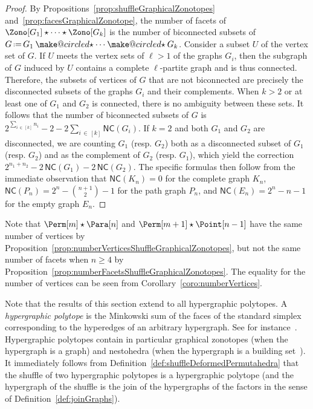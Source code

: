 \documentclass[AHL,Unicode,longabstracts,published]{cedram}
\makeatletter
\newcommand{\eqdef}{\mbox{\,\raisebox{0.2ex}{\scriptsize\ensuremath{\mathrm:}}\ensuremath{=}\,}}
\newcommand{\ostar}{\mathbin{\mathpalette\make@circled\star}}
\newcommand{\make@circled}[2]{%
  \ooalign{$\m@th#1\smallbigcirc{#1}$\cr\hidewidth$\m@th#1#2$\hidewidth\cr}%
}
\newcommand{\smallbigcirc}[1]{%
  \vcenter{\hbox{\scalebox{0.77778}{$\m@th#1\bigcirc$}}}%
}
\newcommand{\joinGraph}{\ostar} %
\newcommand{\shuffleDP}{\star} %
\newcommand{\nc}[1]{\mathsf{NC}(#1)}
\makeatother
\begin{document}
\begin{proof}
By Propositions~\ref{prop:shuffleGraphicalZonotopes} and~\ref{prop:facesGraphicalZonotope}, the number of facets of $\Zono[G_1] \shuffleDP \cdots \shuffleDP\linebreak \Zono[G_k]$ is the number of biconnected subsets of $G \eqdef G_1 \joinGraph \cdots \joinGraph G_k$. Consider a subset $U$ of the vertex set of $G$. If $U$ meets the vertex sets of $\ell > 1$ of the graphs $G_i$, then the subgraph of $G$ induced by $U$ contains a complete $\ell$-partite graph and is thus connected. Therefore, the subsets of vertices of $G$ that are not biconnected are precisely the disconnected subsets of the graphs $G_i$ and their complements. When $k > 2$ or at least one of $G_1$ and $G_2$ is connected, there is no ambiguity between these sets. It follows that the number of biconnected subsets of $G$ is ${2^{\sum_{i\,\in\,[k]} n_i} - 2 - 2\sum_{i\,\in \,[k]} \nc{G_i}}$. If $k = 2$ and both $G_1$ and $G_2$ are disconnected, we are counting $G_1$ (resp. $G_2$) both as a disconnected subset of $G_1$ (resp. $G_2$) and as the complement of $G_2$ (resp. $G_1$), which yield the correction ${2^{n_1 + n_2} - 2 \, \nc{G_1} - 2 \, \nc{G_2}}$. The specific formulas then follow from the immediate observation that $\nc{K_n} = 0$ for the complete graph $K_n$, $\nc{P_n} = 2^n - \binom{n+1}{2} - 1$ for the path graph $P_n$, and $\nc{E_n} = 2^n - n - 1$ for the empty graph $E_n$.
\end{proof}

\begin{rema}\label{rem:numberVerticesGraphicalZonotopes}
Note that $\Perm[m] \shuffleDP \Para[n]$ and $\Perm[m+1] \shuffleDP \Point[n-1]$ have the same number of vertices by Proposition~\ref{prop:numberVerticesShuffleGraphicalZonotopes}, but not the same number of facets when $n \ge 4$ by Proposition~\ref{prop:numberFacetsShuffleGraphicalZonotopes}. The equality for the number of vertices can be seen from Corollary~\ref{coro:numberVertices}.
\end{rema}

\begin{rema}
Note that the results of this section extend to all hypergraphic polytopes. A
\emph{hypergraphic polytope} is the Minkowski sum of the faces of the standard simplex corresponding to the hyperedges of an arbitrary hypergraph. See for instance~\cite{AguiarArdila, BenedettiBergeronMachacek}. Hypergraphic polytopes contain in particular graphical zonotopes (when the hypergraph is a graph) and nestohedra (when the hypergraph is a building set~\cite{FeichtnerSturmfels,Postnikov}). It immediately follows from Definition~\ref{def:shuffleDeformedPermutahedra} that the shuffle of two hypergraphic polytopes is a hypergraphic polytope (and the hypergraph of the shuffle is the join of the hypergraphs of the factors in the sense of Definition~\ref{def:joinGraphs}).
\end{rema}
\end{document}

